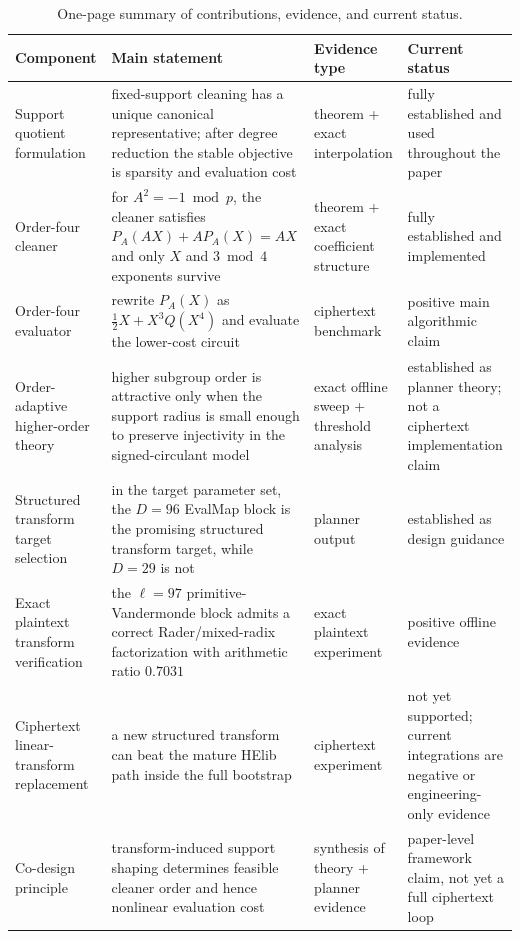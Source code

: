 \documentclass[a4paper,runningheads]{llncs}
\begin{document}
\begin{table}[t]
\centering
\caption{One-page summary of contributions, evidence, and current status.}
\label{tab:one_page_summary}
\scriptsize
\begin{tabular}{p{3.1cm}p{4.3cm}p{2.4cm}p{5.3cm}}
\toprule
\textbf{Component} & \textbf{Main statement} & \textbf{Evidence type} & \textbf{Current status} \\
\midrule
Support quotient formulation
& fixed-support cleaning has a unique canonical representative; after degree reduction the stable objective is sparsity and evaluation cost
& theorem + exact interpolation
& fully established and used throughout the paper \\
Order-four cleaner
& for $A^2=-1\bmod p$, the cleaner satisfies $P_A(AX)+AP_A(X)=AX$ and only $X$ and $3\bmod4$ exponents survive
& theorem + exact coefficient structure
& fully established and implemented \\
Order-four evaluator
& rewrite $P_A(X)$ as $\frac12X+X^3Q(X^4)$ and evaluate the lower-cost circuit
& ciphertext benchmark
& positive main algorithmic claim \\
Order-adaptive higher-order theory
& higher subgroup order is attractive only when the support radius is small enough to preserve injectivity in the signed-circulant model
& exact offline sweep + threshold analysis
& established as planner theory; not a ciphertext implementation claim \\
Structured transform target selection
& in the target parameter set, the $D=96$ EvalMap block is the promising structured transform target, while $D=29$ is not
& planner output
& established as design guidance \\
Exact plaintext transform verification
& the $\ell=97$ primitive-Vandermonde block admits a correct Rader/mixed-radix factorization with arithmetic ratio $0.7031$
& exact plaintext experiment
& positive offline evidence \\
Ciphertext linear-transform replacement
& a new structured transform can beat the mature HElib path inside the full bootstrap
& ciphertext experiment
& not yet supported; current integrations are negative or engineering-only evidence \\
Co-design principle
& transform-induced support shaping determines feasible cleaner order and hence nonlinear evaluation cost
& synthesis of theory + planner evidence
& paper-level framework claim, not yet a full ciphertext loop \\
\bottomrule
\end{tabular}
\end{table}
\end{document}
